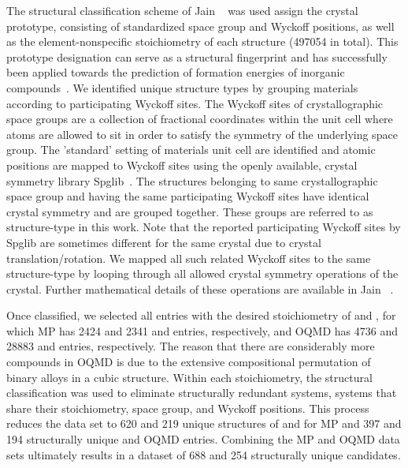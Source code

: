 %
%
The structural classification scheme of Jain ~\cite{Jain2018} was used assign the crystal prototype,
consisting of standardized space group and Wyckoff positions,
as well as the element-nonspecific stoichiometry of each structure (\num{497054} in total).
%
This prototype designation can serve as a structural fingerprint and has successfully been applied towards the prediction of formation energies of inorganic compounds~\cite{Jain2018}.
%
We identified unique structure types by grouping materials according to participating Wyckoff sites.
%
The Wyckoff sites of crystallographic space groups are a collection of fractional coordinates within the unit cell where atoms are allowed to sit in order to satisfy the symmetry of the underlying space group.
%
The 'standard' setting of materials unit cell are identified and atomic positions are mapped to Wyckoff sites using the openly available, crystal symmetry library Spglib~\cite{spglib}.
%
The structures belonging to same crystallographic space group and having the same participating Wyckoff sites have identical crystal symmetry and are grouped together.
%
These groups are referred to as structure-type in this work.
%
Note that the reported participating Wyckoff sites by Spglib are sometimes different for the same crystal due to crystal translation/rotation.
%
We mapped all such related Wyckoff sites to the same structure-type by looping through all allowed crystal symmetry operations of the crystal.
%
Further mathematical details of these operations are available in Jain ~\cite{Jain2018}.


%
%
Once classified, we selected all entries with the desired stoichiometry of \ABtwo and \ABthree,
for which MP has \num{2424} and \num{2341} \ABtwo and \ABthree entries, respectively,
and OQMD has \num{4736} and \num{28883} \ABtwo and \ABthree entries, respectively.
%
The reason that there are considerably more \ABthree compounds in OQMD is due to the extensive compositional permutation of binary alloys in a cubic \ABthree structure.
%
Within each stoichiometry, the structural classification was used to eliminate structurally redundant systems,
 systems that share their stoichiometry, space group, and Wyckoff positions.
%
This process reduces the data set to \num{620} and \num{219} unique structures of \ABtwo and \ABthree for MP and \num{397} and \num{194} structurally unique \ABtwo and \ABthree OQMD entries.
%
Combining the MP and OQMD data sets ultimately results in a dataset of \num{688} \ABtwo and \num{254} \ABthree structurally unique candidates.


